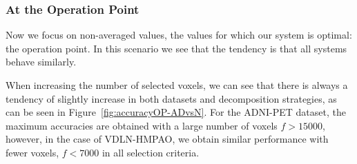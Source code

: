 \subsubsection{At the Operation Point}
Now we focus on non-averaged values, the values for which our system is optimal: the operation point. In this scenario we see that the tendency is that all systems behave similarly. 

When increasing the number of selected voxels, we can see that there is always a tendency of slightly increase in both datasets and decomposition strategies, as can be seen in Figure~\ref{fig:accuracyOP-ADvsN}. For the ADNI-PET dataset, the maximum accuracies are obtained with a large number of voxels $f>15000$, however, in the case of VDLN-HMPAO, we obtain similar performance with fewer voxels, $f<7000$ in all selection criteria. 

